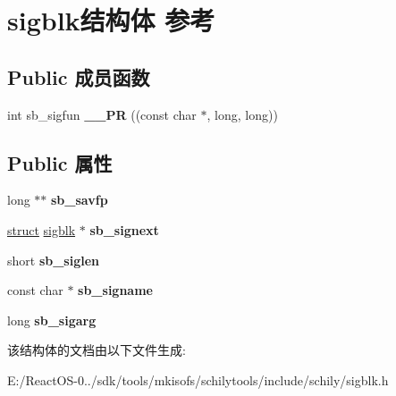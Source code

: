 \hypertarget{structsigblk}{}\section{sigblk结构体 参考}
\label{structsigblk}
\subsection*{Public 成员函数}
\begin{DoxyCompactItemize}
\item 
\mbox{\label{structsigblk_a159ec661f60a4e90669ba38840d0bdc4}} 
int sb\+\_\+sigfun {\bfseries \+\_\+\+\_\+\+PR} ((const char $\ast$, long, long))
\end{DoxyCompactItemize}
\subsection*{Public 属性}
\begin{DoxyCompactItemize}
\item 
\mbox{\label{structsigblk_a387c156d322298860acf4bfb48143b36}} 
long $\ast$$\ast$ {\bfseries sb\+\_\+savfp}
\item 
\mbox{\label{structsigblk_a93d7ad28dd822db5421c9112be508982}} 
\hyperlink{interfacestruct}{struct} \hyperlink{structsigblk}{sigblk} $\ast$ {\bfseries sb\+\_\+signext}
\item 
\mbox{\label{structsigblk_af80557d3abd4b0df053fcb7f8c8e8efa}} 
short {\bfseries sb\+\_\+siglen}
\item 
\mbox{\label{structsigblk_a1e82dce468a76ea447c0a357262b8270}} 
const char $\ast$ {\bfseries sb\+\_\+signame}
\item 
\mbox{\label{structsigblk_a4b8523ee23317a9f7018f93f48110bf8}} 
long {\bfseries sb\+\_\+sigarg}
\end{DoxyCompactItemize}


该结构体的文档由以下文件生成\+:\begin{DoxyCompactItemize}
\item 
E\+:/\+React\+O\+S-\/0../sdk/tools/mkisofs/schilytools/include/schily/sigblk.\+h\end{DoxyCompactItemize}
